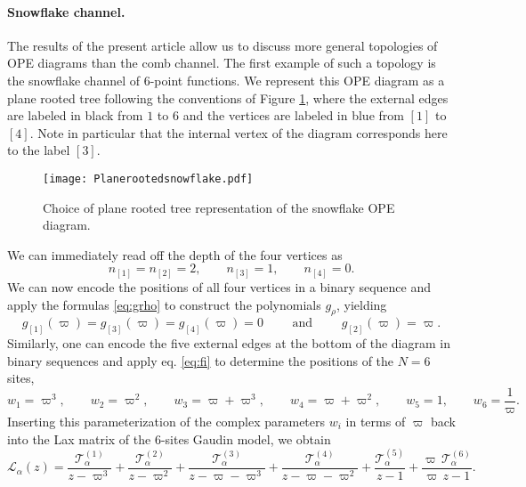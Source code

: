 \documentclass{article}
\def\Lc{\mathcal{L}}
\begin{document}
\paragraph{Snowflake channel.} The results of the present article allow us to discuss more general 
topologies of OPE diagrams than the comb channel. The first example of such a topology is the snowflake 
channel of $6$-point functions. We represent this OPE diagram as a plane rooted tree following the 
conventions of Figure \ref{fig:snowflake}, where the external edges are labeled in black from $1$ 
to $6$ and the vertices are labeled in blue from $[1]$ to $[4]$. Note in particular that the 
internal vertex of the diagram corresponds here to the label $[3]$.
\begin{figure}[H]
\begin{center}
\texttt{[image: Planerootedsnowflake.pdf]}
\caption{Choice of plane rooted tree representation of the snowflake OPE diagram.}\label{fig:snowflake}
\end{center}
\end{figure}
We can immediately read off the depth of the four vertices as
\begin{equation}
n_{[1]}=n_{[2]}=2, \qquad n_{[3]}=1, \qquad n_{[4]}=0.
\end{equation}
We can now encode the positions of all four vertices in a binary sequence and apply the formulas 
\eqref{eq:grho} to construct the polynomials $g_\rho$, yielding  
\begin{equation}
g_{[1]}(\varpi) = g_{[3]}(\varpi) = g_{[4]}(\varpi) = 0 \qquad \text{ and } \qquad g_{[2]}(\varpi) = \varpi.
\end{equation}
Similarly, one can encode the five external edges at the bottom of the diagram in binary sequences and apply eq. \eqref{eq:fi} to determine the positions of the $N=6$ sites, 
\begin{equation}\label{Eq:zSnow}
w_1 = \varpi^3, \qquad w_2 = \varpi^2, \qquad w_3 = \varpi+\varpi^3, \qquad w_4 = \varpi+\varpi^2, 
\qquad w_5 = 1, \qquad w_6 = \frac{1}{\varpi}.
\end{equation}
Inserting this parameterization of the complex parameters $w_i$ in terms of $\varpi$ back into the Lax 
matrix of the 6-sites Gaudin model, we obtain 
\begin{equation}
\Lc_\alpha(z) = \frac{\mathcal{T}_\alpha^{(1)}}{z-\varpi^3} + 
\frac{\mathcal{T}_\alpha^{(2)}}{z-\varpi^2} + 
\frac{\mathcal{T}_\alpha^{(3)}}{z-\varpi-\varpi^3} + 
\frac{\mathcal{T}_\alpha^{(4)}}{z-\varpi-\varpi^2} + 
\frac{\mathcal{T}_\alpha^{(5)}}{z-1} + \frac{\varpi\,\mathcal{T}_\alpha^{(6)}}{\varpi\,z-1}.
\end{equation}
\end{document}
